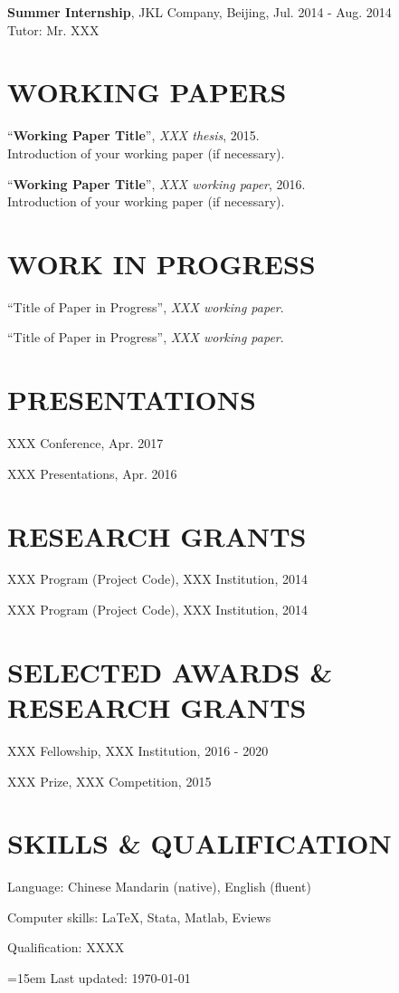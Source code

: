 \documentclass{res} 			%
\begin{document}
\begin{resume}
    {\bf Summer Internship}, 
    JKL Company, Beijing, 
    Jul. 2014 - Aug. 2014 \\
    Tutor: Mr. XXX
    

\section{WORKING PAPERS} 
\vspace{0.1in}
	``{\bf Working Paper Title}'', {\sl XXX thesis}, 2015. \\
		Introduction of your working paper (if necessary).

	``{\bf Working Paper Title}'', {\sl XXX working paper}, 2016. \\
		Introduction of your working paper (if necessary).


\section{WORK IN PROGRESS}
\vspace{0.1in}
	``Title of Paper in Progress'', {\sl XXX working paper}.
	
	``Title of Paper in Progress'', {\sl XXX working paper}.


\section{PRESENTATIONS} 
\vspace{0.1in}
	XXX Conference, Apr. 2017
	
	XXX Presentations, Apr. 2016
	
	
\section{RESEARCH GRANTS} 
\vspace{0.1in}
	XXX Program (Project Code), XXX Institution, 2014
	
	XXX Program (Project Code), XXX Institution, 2014
	
	
\section{SELECTED AWARDS \& RESEARCH GRANTS} 
\vspace{0.1in}
   XXX Fellowship, XXX Institution, 2016 - 2020
   
   XXX Prize, XXX Competition, 2015


\section{SKILLS \& QUALIFICATION} 
\vspace{0.1in}
   Language: Chinese Mandarin (native), English (fluent)

   Computer skills: \LaTeX, Stata, Matlab, Eviews
   
   Qualification: XXXX
   

\end{resume}

\vspace{0.5in}
\leftskip=15em Last updated: \today
\end{document}
